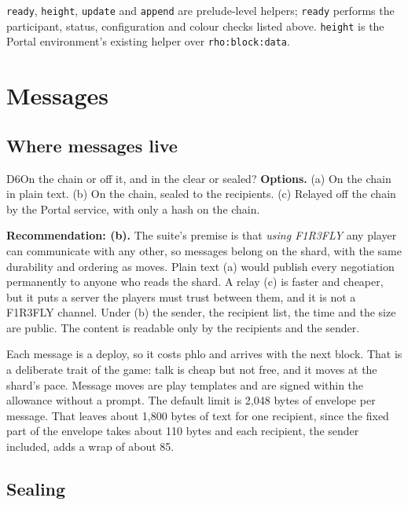 \documentclass[11pt,a4paper]{article}
\newcommand{\code}[1]{\texttt{#1}}
\begin{document}
\code{ready}, \code{height}, \code{update} and \code{append} are prelude-level helpers; \code{ready}
performs the participant, status, configuration and colour checks listed above. \code{height} is the Portal environment's existing helper over \code{rho:block:data}.

\section{Messages}\label{sec:mail}

\subsection{Where messages live}

\begin{decision}{D6}{On the chain or off it, and in the clear or sealed?}
\textbf{Options.} (a) On the chain in plain text. (b) On the chain, sealed to the recipients.
(c) Relayed off the chain by the Portal service, with only a hash on the chain.

\textbf{Recommendation: (b).} The suite's premise is that \emph{using F1R3FLY} any player can
communicate with any other, so messages belong on the shard, with the same durability and
ordering as moves. Plain text (a) would publish every negotiation permanently to anyone who
reads the shard. A relay (c) is faster and cheaper, but it puts a server the players must
trust between them, and it is not a F1R3FLY channel. Under (b) the sender, the recipient list,
the time and the size are public. The content is readable only by the recipients and the
sender.
\end{decision}

Each message is a deploy, so it costs phlo and arrives with the next block. That is a
deliberate trait of the game: talk is cheap but not free, and it moves at the shard's pace.
Message moves are play templates and are signed within the allowance without a prompt.
The default limit is 2,048 bytes of envelope per message. That leaves about 1,800 bytes of
text for one recipient, since the fixed part of the envelope takes about 110 bytes and each
recipient, the sender included, adds a wrap of about 85.

\subsection{Sealing}\label{sec:sealing}
\end{document}
